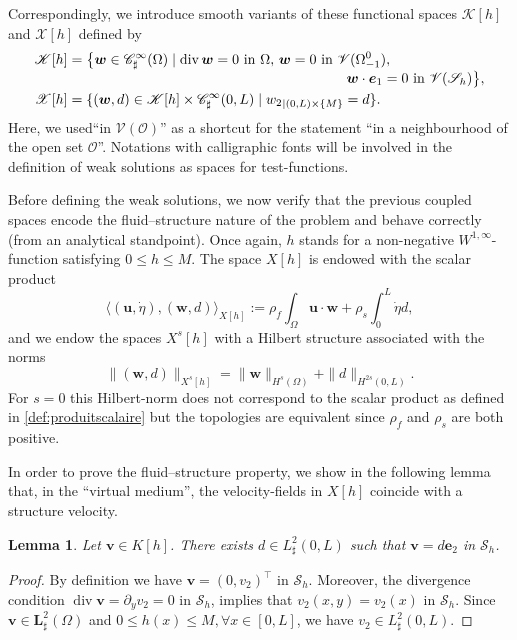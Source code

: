 \documentclass[10pt]{amsart}
\let\mathcal\mathscr
\newtheorem{lemma}[theorem]{Lemma}
\theoremstyle{remark}
\theoremstyle{definition}
\newcommand{\ug}{\boldsymbol{u}}
\newcommand{\vg}{\boldsymbol{v}}
\DeclareMathOperator{\DIV}{div}
\newcommand{\wg}{\boldsymbol{w}}
\newcommand{\BS}[1]{\boldsymbol{#1}}
\let\CM\Omega
\newcommand{\etap}{\dot{\eta}}
\begin{document}
Correspondingly, we introduce smooth variants of these functional spaces $\mathcal{K}[h]$ and $\mathcal{X}[h]$ defined by
\begin{align}
\mathcal{K}[h]&=\bigl\{\wg\in\mathcal{C}^{\infty}_{\sharp}(\CM)\mid \DIV{\wg}=0\text{ in }\CM,\,\wg=0\text{ in }\mathcal{V}(\Omega_{-1}^{0}),\\[-3pt]
&\hspace*{7cm}\wg\cdot\BS{e}_{1}=0\text{ in } \mathcal V(\mathcal{S}_{h})\bigl\},\notag\\
\mathcal{X}[h]&=\{(\wg,d)\in \mathcal{K}[h]\times \mathcal{C}^{\infty}_{\sharp}(0,L)\mid {w_{2}}_{|{(0, L)\times \{M\}}}=d\}.
\end{align}
Here, we used``in $\mathcal{V}(\mathcal O)$'' as a shortcut for the statement ``in a neighbourhood of the open set $\mathcal O$''.
Notations with calligraphic fonts will be involved in the definition of weak solutions as spaces for test-functions.

Before defining the weak solutions, we now verify that the previous coupled spaces encode
the fluid--structure nature of the problem and behave correctly (from an analytical standpoint).
Once again, $h$ stands for a non-negative $W^{1, \infty}$-function satisfying $0\leq h \leq M$.
The space $X[h]$ is endowed with the scalar product\vspace*{-3pt}
\begin{equation}
\label{def:produitscalaire}
\langle (\ug,\etap),(\wg,d)\rangle_{X[h]}:=\rho_{f}\int_{\CM}\ug\cdot\wg + \rho_{s}\int_{0}^{L}\etap d,\end{equation}
and we endow the spaces $X^s[h]$ with a Hilbert structure associated with the norms\vspace*{-3pt}\enlargethispage{.5\baselineskip}%
\[
\|(\wg,d)\|_{X^s[h]}= \|\wg\|_{H^s(\Omega)} + \|d\|_{H^{2s}(0,L)}.
\]
For $s=0$ this Hilbert-norm does not correspond to the scalar product as defined in \eqref{def:produitscalaire}
but the topologies are equivalent since $\rho_f$ and $\rho_s$ are both positive.

In order to prove the fluid--structure property, we show in the following lemma that,
in the ``virtual medium'', the velocity-fields in $X[h]$ coincide with a structure velocity.
\begin{lemma}Let $\vg \in K[h]$. There exists $d\in L_{\sharp}^{2}(0,L)$ such that $\vg=d\BS{e}_{2}$ in $\mathcal{S}_{h}$. \end{lemma}
\begin{proof}
By definition we have $\vg=(0,v_{2})^{\top}$ in $\mathcal{S}_{h}$. Moreover, the divergence condition
$\DIV{\vg}=\partial_yv_{2}=0\text{ in }\mathcal{S}_{h}$,
implies that $v_{2}(x,y)=v_{2}(x)$ in $\mathcal{S}_{h}$. Since $\vg\in \BS{L}^2_\sharp(\CM)$ and $0\leq h(x) \leq M, \forall x\in [0, L]$, we have $v_2\in L_\sharp^2(0, L)$.
\end{proof}
\end{document}
